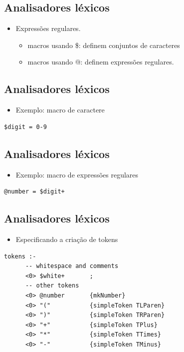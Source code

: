 \documentclass[11pt]{article}
\begin{document}
\subsection*{Analisadores léxicos}
\label{sec:org378d40d}

\begin{itemize}
\item Expressões regulares.
\begin{itemize}
\item macros usando \$: definem conjuntos de caracteres
\item macros usando @: definem expressões regulares.
\end{itemize}
\end{itemize}
\subsection*{Analisadores léxicos}
\label{sec:org6893010}

\begin{itemize}
\item Exemplo: macro de caractere
\end{itemize}

\begin{verbatim}
$digit = 0-9
\end{verbatim}
\subsection*{Analisadores léxicos}
\label{sec:org40b9ad2}

\begin{itemize}
\item Exemplo: macro de expressões regulares
\end{itemize}

\begin{verbatim}
@number = $digit+
\end{verbatim}
\subsection*{Analisadores léxicos}
\label{sec:org7860fc1}

\begin{itemize}
\item Especificando a criação de tokens
\end{itemize}

\begin{verbatim}
tokens :-
      -- whitespace and comments
      <0> $white+       ;
      -- other tokens
      <0> @number       {mkNumber}
      <0> "("           {simpleToken TLParen}
      <0> ")"           {simpleToken TRParen}
      <0> "+"           {simpleToken TPlus}
      <0> "*"           {simpleToken TTimes}
      <0> "-"           {simpleToken TMinus}
\end{verbatim}
\end{document}
